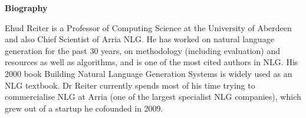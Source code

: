\vspace{3em}\par 

\vfill
\noindent

{\bfseries Biography} 

Ehud Reiter is a Professor of Computing Science at the University of Aberdeen
and also Chief Scientist of Arria NLG. He has worked on natural language generation 
for the past 30 years, on methodology (including evaluation) and resources as well 
as algorithms, and is one of the most cited authors in NLG. His 2000 book Building 
Natural Language Generation Systems is widely used as an NLG textbook. Dr Reiter 
currently spends most of his time trying to commercialise NLG at Arria (one of the 
largest specialist NLG companies), which grew out of a startup he cofounded in 
2009.
\newpage
